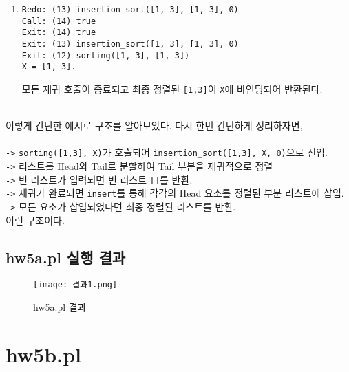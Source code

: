 \documentclass{article}
\begin{document}
\begin{enumerate}
\item
\begin{verbatim}
Redo: (13) insertion_sort([1, 3], [1, 3], 0)
Call: (14) true
Exit: (14) true
Exit: (13) insertion_sort([1, 3], [1, 3], 0)
Exit: (12) sorting([1, 3], [1, 3])
X = [1, 3].
\end{verbatim}
모든 재귀 호출이 종료되고 최종 정렬된 \texttt{[1,3]}이 \texttt{X}에 바인딩되어 반환된다. \\ \\

\end{enumerate}


이렇게 간단한 예시로 구조를 알아보았다. 다시 한번 간단하게 정리하자면, \\ \\
\texttt{->} \texttt{sorting([1,3], X)}가 호출되어 \texttt{insertion\_sort([1,3], X, 0)}으로 진입. \\  
\texttt{->} 리스트를 Head와 Tail로 분할하여 Tail 부분을 재귀적으로 정렬 \\  
\texttt{->} 빈 리스트가 입력되면 빈 리스트 \texttt{[]}를 반환. \\
\texttt{->} 재귀가 완료되면 \texttt{insert}를 통해 각각의 Head 요소를 정렬된 부분 리스트에 삽입.\\
\texttt{->} 모든 요소가 삽입되었다면 최종 정렬된 리스트를 반환.  
\\
이런 구조이다.


\subsection{hw5a.pl 실행 결과}


\begin{figure} [H]
    \centering
    \texttt{[image: 결과1.png]}
    \caption{hw5a.pl 결과}
    \label{fig:enter-label}
\end{figure}



\newpage
\section{hw5b.pl}
\end{document}
